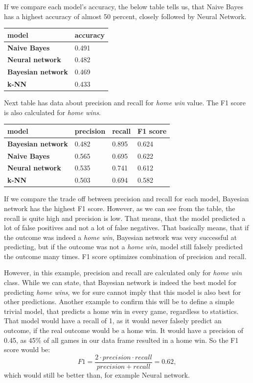 \documentclass[conference]{IEEEtran}
\begin{document}
If we compare each model's accuracy, the below table tells us, that Naive Bayes has a highest accuracy of
almost 50 percent, closely followed by Neural Network.

\begin{table}[!ht]
    \centering
    \begin{tabular}{ll}
        model & accuracy \\ \hline
        \textbf{Naive Bayes} & 0.491 \\ 
        \textbf{Neural network} & 0.482 \\ 
        \textbf{Bayesian network} & 0.469 \\ 
        \textbf{k-NN} & 0.433 \\ 
    \end{tabular}
\end{table}



Next table has data about precision and recall for \textit{home win} value. The F1 score is also
calculated for \textit{home wins}.

\begin{table}[!ht]
    \centering
    \begin{tabular}{llll}
        model & precision & recall & F1 score \\ \hline
        \textbf{Bayesian network} & 0.482 & 0.895 & 0.624 \\ 
        \textbf{Naive Bayes} & 0.565 & 0.695 & 0.622 \\ 
        \textbf{Neural network} & 0.535 & 0.741 & 0.612 \\ 
        \textbf{k-NN} & 0.503 & 0.694 & 0.582 \\ 
    \end{tabular}
\end{table}


If we compare the trade off between precision and recall for each model, Bayesian network
has the highest F1 score. However, as we can see from the table, the recall is quite high and
precision is low. That means, that the model predicted a lot of false positives and not a lot 
of false negatives. That basically means, that if the outcome was indeed a \textit{home win},
Bayesian network was very successful at predicting, but if the outcome was not a \textit{home win},
model still falsely predicted the outcome many times. F1 score optimizes combination of precision 
and recall. 

However, in this example, precision and recall are calculated only for \textit{home win}
class. While we can state, that Bayesian network is indeed the best model for predicting 
\textit{home wins}, we for sure cannot imply that this model is also best for other predictions.
Another example to confirm this will be to define a simple trivial model, that predicts a home win in 
every game, regardless to statistics. That model would have a recall of 1, as it would never falsely 
predict an outcome, if the real outcome would be a home win. It would have a precision of 0.45, as
45\% of all games in our data frame resulted in a home win. So the F1 score would be:
$$F1 = \frac{2 \cdot precision \cdot recall}{precision + recall} = 0.62,$$ which would still be better than,
for example Neural network. 
\end{document}
